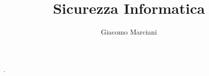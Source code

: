 \documentclass[10pt,a4paper,oneside,final]{amsbook}
\numberwithin{equation}{section}
\begin{document}
	.
\newtheorem{definition}{Definition}
\newtheorem{theorem}{Theorem}

\title{Sicurezza Informatica}

\author{Giacomo Marciani}

\address{University of Rome Tor Vergata}

\tableofcontents












\end{document}
